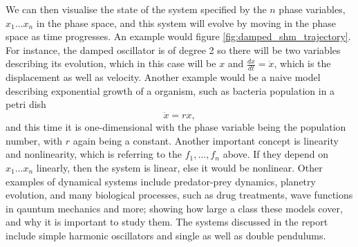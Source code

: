 \documentclass{statsmsc}
\begin{document}
We can then visualise the state of the system specified by the $n$ phase variables, $x_1 \dots x_n$ in the phase space, and this system will evolve by moving in the phase space as time progresses. 
An example would figure \ref{fig:damped_shm_trajectory}.
For instance, the damped oscillator is of degree 2 so there will be two variables describing its evolution, which in this case will be $x$ and $\frac{dx}{dt}=\dot{x}$, which is the displacement as well as velocity.
Another example would be a naive model describing exponential growth of a organism, such as bacteria population in a petri dish
$$
\dot{x}=rx,
$$
and this time it is one-dimensional with the phase variable being the population number, with $r$ again being a constant.
Another important concept is linearity and nonlinearity, which is referring to the $f_1, \dots ,f_n$ above.
If they depend on $x_1 \dots x_n$ linearly, then the system is linear, else it would be nonlinear.
Other examples of dynamical systems include predator-prey dynamics, planetry evolution, and many biological processes, such as drug treatments, wave functions in qauntum mechanics and more; showing how large a class these models cover, and why it is important to study them.
The systems discussed in the report include simple harmonic oscillators and single as well as double pendulums.
\end{document}
